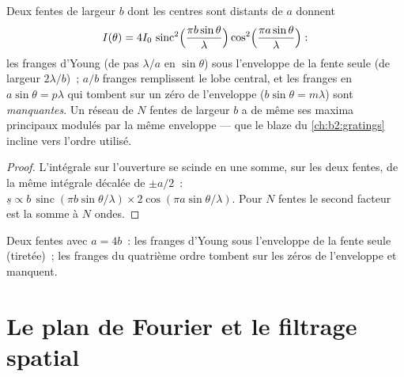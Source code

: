 \begin{proposition}\label{prop:b2:diffraction:combined}
Deux fentes de largeur $b$ dont les centres sont distants de $a$ donnent
\[
I(\theta) = 4I_0\,\operatorname{sinc}^2\Bigl(\frac{\pi b\sin\theta}\lambda\Bigr)\cos^2\Bigl(\frac{\pi a\sin\theta}\lambda\Bigr) :
\]
les franges d'Young (de pas $\lambda/a$ en $\sin\theta$) sous l'enveloppe de la
fente seule (de largeur $2\lambda/b$)~; $a/b$ franges remplissent le lobe central, et les
franges en $a\sin\theta = p\lambda$ qui tombent sur un zéro de l'enveloppe
($b\sin\theta = m\lambda$) sont \emph{manquantes}. Un réseau de $N$ fentes de largeur
$b$ a de même ses maxima principaux modulés par la même enveloppe ---
que le blaze du \cref{ch:b2:gratings} incline vers l'ordre utilisé.
\end{proposition}

\begin{proof}
L'intégrale sur l'ouverture se scinde en une somme, sur les deux fentes, de la même
intégrale décalée de $\pm a/2$~: $\underline s \propto b\,\operatorname{sinc}(\pi b\sin\theta/\lambda)
\times2\cos(\pi a\sin\theta/\lambda)$. Pour $N$ fentes le second facteur est la
somme à $N$ ondes.
\end{proof}

\begin{omfigure}

{\small Deux fentes avec $a = 4b$~: les franges d'Young sous l'enveloppe de la
fente seule (tiretée)~; les franges du quatrième ordre tombent sur les zéros de
l'enveloppe et manquent.}
\end{omfigure}

\section{Le plan de Fourier et le filtrage spatial}

